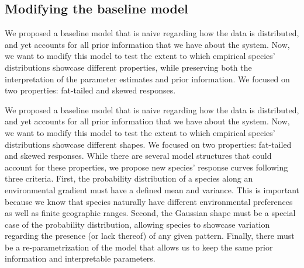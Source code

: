 \documentclass[11pt, a4paper]{article}
\begin{document}
\subsection*{Modifying the baseline model}
We proposed a baseline model that is naive regarding how the data is distributed, and yet accounts for all prior information that we have about the system. Now, we want to modify this model to test the extent to which empirical species' distributions showcase different properties, while preserving both the interpretation of the parameter estimates and prior information. We focused on two properties: fat-tailed and skewed responses. 



We proposed a baseline model that is naive regarding how the data is distributed, and yet accounts for all prior information that we have about the system. Now, we want to modify this model to test the extent to which empirical species' distributions showcase different shapes. We focused on two properties: fat-tailed and skewed responses. While there are several model structures that could account for these properties, we propose new species' response curves following three criteria. First, the probability distribution of a species along an environmental gradient must have a defined mean and variance. This is important because we know that species naturally have different environmental preferences as well as finite geographic ranges. Second, the Gaussian shape must be a special case of the probability distribution, allowing species to showcase variation regarding the presence (or lack thereof) of any given pattern. Finally, there must be a re-parametrization of the model that allows us to keep the same prior information and interpretable parameters.
\end{document}
